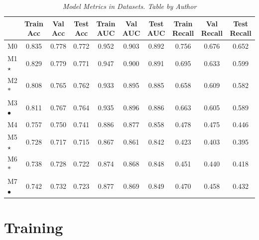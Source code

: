 \begin{landscape}

\begin{table}
\centering
\begin{tabular}{lccccccccc}
    \toprule
 & Train Acc & Val Acc & Test Acc & Train AUC & Val AUC &  Test AUC & Train Recall & Val Recall &  Test Recall \\
 \midrule
M0 & 0.835 & 0.778 & 0.772 & 0.952 & 0.903 & 0.892 & 0.756 & 0.676 & 0.652 \\
M1 $\star$ & 0.829 & 0.779 & 0.771 & 0.947 & 0.900 & 0.891 & 0.695 & 0.633 & 0.599 \\
M2 $\ast$ & 0.808 & 0.765 & 0.762 & 0.933 & 0.895 & 0.885 & 0.658 & 0.609 & 0.582 \\
M3 $\bullet$ & 0.811 & 0.767 & 0.764 & 0.935 & 0.896 & 0.886 & 0.663 & 0.605 & 0.589 \\
\cellcolor{gray!50}M4 & \cellcolor{gray!50}0.757 & \cellcolor{gray!50}0.750 & \cellcolor{gray!50}0.741 &  \cellcolor{gray!50}0.886 & \cellcolor{gray!50}0.877 & \cellcolor{gray!50}0.858 & \cellcolor{gray!50}0.478 & \cellcolor{gray!50}0.475 & \cellcolor{gray!50}0.446 \\
\cellcolor{gray!50}M5 $\star$ & \cellcolor{gray!50}0.728 & \cellcolor{gray!50}0.717 &  \cellcolor{gray!50}0.715 & \cellcolor{gray!50}0.867 & \cellcolor{gray!50}0.861 & \cellcolor{gray!50}0.842 & \cellcolor{gray!50}0.423 & \cellcolor{gray!50}0.403 & \cellcolor{gray!50}0.395 \\
\cellcolor{gray!50}M6 $\ast$ & \cellcolor{gray!50}0.738 & \cellcolor{gray!50}0.728 &  \cellcolor{gray!50}0.722 & \cellcolor{gray!50}0.874 & \cellcolor{gray!50}0.868 & \cellcolor{gray!50}0.848 & \cellcolor{gray!50}0.451 & \cellcolor{gray!50}0.440 & \cellcolor{gray!50}0.418 \\
\cellcolor{gray!50}M7 $\bullet$ & \cellcolor{gray!50}0.742 & \cellcolor{gray!50}0.732 &  \cellcolor{gray!50}0.723 & \cellcolor{gray!50}0.877 & \cellcolor{gray!50}0.869 & \cellcolor{gray!50}0.849 & \cellcolor{gray!50}0.470 & \cellcolor{gray!50}0.458 & \cellcolor{gray!50}0.432 \\
\bottomrule
\end{tabular}
\caption[Model Metrics in Datasets]
  {\textit{Model Metrics in Datasets. Table by Author}}
{\label{table:resume-metrics}}
\end{table}

\end{landscape}


\section{Training}

